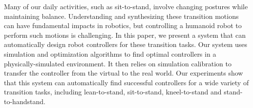 Many of our daily activities, such as sit-to-stand, involve changing postures while maintaining balance. Understanding and synthesizing these transition motions can have fundamental impacts in robotics, but controlling a humanoid robot to perform such motions is challenging. In this paper, we present a system that can automatically design robot controllers for these transition tasks. Our system uses simulation and optimization algorithms to find optimal controllers in a physically-simulated environment. It then relies on simulation calibration to transfer the controller from the virtual to the real world. Our experiments show that this system can automatically find successful controllers for a wide variety of transition tasks, including lean-to-stand, sit-to-stand, kneel-to-stand and stand-to-handstand.
